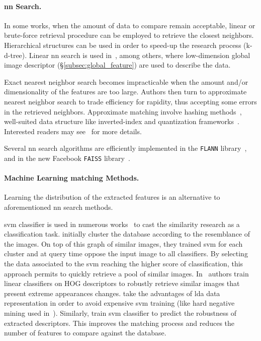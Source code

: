 \paragraph{\Acl{nn} Search.}
In some works, when the amount of data to compare remain acceptable, linear or brute-force retrieval procedure can be employed to retrieve the closest neighbors. Hierarchical structures can be used in order to speed-up the research process (\eg k-d-tree). Linear \ac{nn} search is used in~\citep{Babenko2014,Sunderhauf2015,Radenovic2016,Gordo2016,Arandjelovic2017,Zamir2010,Zamir2014,Sunderhauf2015a}, among others, where low-dimension global image descriptor (\S\ref{subsec:global_feature}) are used to describe the data.

Exact nearest neighbor search becomes impracticable when the amount and/or dimensionality of the features are too large. Authors then turn to approximate nearest neighbor search to trade efficiency for rapidity, thus accepting some errors in the retrieved neighbors. Approximate matching involve hashing methods~\citep{Gionis1999}, well-suited data structure like inverted-index and quantization frameworks~\citep{Nister2006,Philbin2007,Jegou2011}. Interested readers may see~\citep{Wang2017} for more details.

Several \ac{nn} search algorithms are efficiently implemented in the \texttt{FLANN} library~\citep{Muja2009}, and in the new Facebook \texttt{FAISS} library~\citep{Johnson2017}.

\paragraph{Machine Learning matching Methods.}
Learning the distribution of the extracted features is an alternative to aforementioned \ac{nn} search methods.

\Ac{svm} classifier is used in numerous works~\citep{Shrivastava2011,Cao2013,McManus2014,Aubry2014,Linegar2016} to cast the similarity research as a classification task. \citet{Cao2013} initially cluster the database according to the resemblance of the images. On top of this graph of similar images, they trained \ac{svm} for each cluster and at query time oppose the input image to all classifiers. By selecting the data associated to the \ac{svm} reaching the higher score of classification, this approach permits to quickly retrieve a pool of similar images. In~\citep{McManus2014,Aubry2014} authors train linear classifiers on HOG descriptors to robustly retrieve similar images that present extreme appearances changes. \citet{Aubry2014} take the advantages of \ac{lda} data representation in order to avoid expensive \ac{svm} training (like hard negative mining used in~\citep{Shrivastava2011,Kim2015}). Similarly, \citet{Kim2015} train \ac{svm} classifier to predict the robustness of extracted descriptors. This improves the matching process and reduces the number of features to compare against the database.

